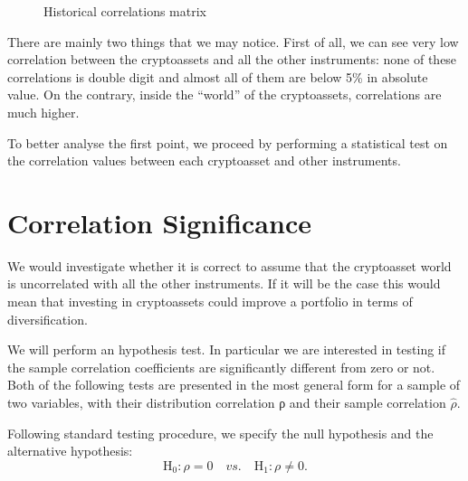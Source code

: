 \begin{figure}[H]
    \centering
    \caption{Historical correlations matrix}
\end{figure}
\bigskip

There are mainly two things that we may notice. First of all, we can see very low correlation between the cryptoassets and all the other instruments: none of these correlations is double digit and almost all of them are below 5\% in absolute value. On the contrary, inside the “world” of the cryptoassets, correlations are much higher.

\noindent
To better analyse the first point, we proceed by performing a statistical test on the correlation values between each cryptoasset and other instruments.

\section{Correlation Significance}

We would investigate whether it is correct to assume that the cryptoasset world is uncorrelated with all the other instruments. If it will be the case this would mean that investing in cryptoassets could improve a portfolio in terms of diversification.

\noindent
We will perform an hypothesis test. In particular we are interested in testing if the sample correlation coefficients are significantly different from zero or not. Both of the following tests are presented in the most general form for a sample of two variables, with their distribution correlation ρ and their sample correlation $\hat{\rho}$.

Following standard testing procedure, we specify the null hypothesis and the alternative hypothesis:
\begin{equation}
    \text{H}_0 : \rho = 0 \quad  vs. \quad \text{H}_1 : \rho \neq 0.
\end{equation}

